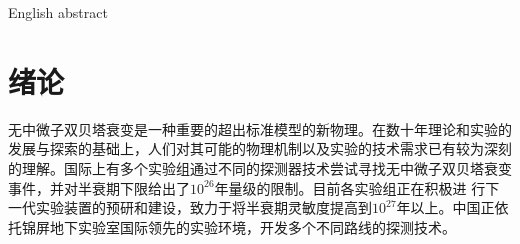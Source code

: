 \documentclass[type=master]{fduthesis}
\begin{document}

\frontmatter

\tableofcontents
\listoffigures
\listoftables

\begin{abstract}
  中微子可能的马约拉纳粒子属性超出了目前标准模型的范畴，是粒子物
理与核物理研究领域最重要的科学问题之一。无中微子双贝塔衰变($0\nu\beta\beta$)实验是能够确定
中微子马约拉纳属性的唯一途径。$0\nu\beta\beta$的发现可以揭示中微子绝对质量、轻子数破缺、
物质—反物质不对称等一系列自然奥秘，是当今粒子物理与核物理研究的前沿课题。在
探索无中微子双贝塔衰变的可选择实验方案中，低温晶体量热器具有高能量分辨率、高
运行稳定性和低辐射本底的技术优势，成为新一代$0\nu\beta\beta$实验最具竞争力的探测器技术之
一。

{\color{green} 以上引自}\cite{Ma2020Majorana}。

\end{abstract}

\begin{abstract*}
  English abstract
\end{abstract*}


\mainmatter

%   
%   
%   

\chapter{绪论}
无中微子双贝塔衰变是一种重要的超出标准模型的新物理。在数十年理论和实验的发展与探索的基础上，人们对其可能的物理机制以及实验的技术需求已有较为深刻的理解。国际上有多个实验组通过不同的探测器技术尝试寻找无中微子双贝塔衰变事件，并对半衰期下限给出了$10^{26}$年量级的限制。目前各实验组正在积极进
行下一代实验装置的预研和建设，致力于将半衰期灵敏度提高到$10^{27}$年以上。中国正依托锦屏地下实验室国际领先的实验环境，开发多个不同路线的探测技术。
\end{document}
